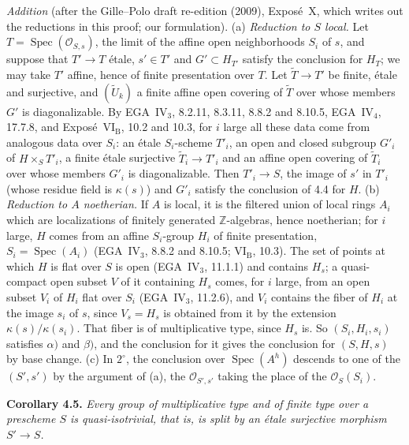 \par\medskip\noindent
\emph{Addition} (after the Gille--Polo draft re-edition (2009), Expos\'e~X,
which writes out the reductions in this proof; our formulation).
(a) \emph{Reduction to \(S\) local.} Let \(T=\operatorname{Spec}(\mathcal
O_{S,s})\), the limit of the affine open neighborhoods \(S_i\) of \(s\), and
suppose that \(T'\to T\) étale, \(s'\in T'\) and \(G'\subset H_{T'}\) satisfy
the conclusion for \(H_T\); we may take \(T'\) affine, hence of finite
presentation over \(T\). Let \(\widetilde T\to T'\) be finite, étale and
surjective, and \((\widetilde U_k)\) a finite affine open covering of
\(\widetilde T\) over whose members \(G'\) is diagonalizable. By
EGA~IV\(_3\), 8.2.11, 8.3.11, 8.8.2 and 8.10.5, EGA~IV\(_4\), 17.7.8, and
Expos\'e~VI\(_{\mathrm B}\), 10.2 and 10.3, for \(i\) large all these data
come from analogous data over \(S_i\): an étale \(S_i\)-scheme \(T'_i\), an
open and closed subgroup \(G'_i\) of \(H\times_ST'_i\), a finite étale
surjective \(\widetilde T_i\to T'_i\) and an affine open covering of
\(\widetilde T_i\) over whose members \(G'_i\) is diagonalizable. Then
\(T'_i\to S\), the image of \(s'\) in \(T'_i\) (whose residue field is
\(\kappa(s)\)) and \(G'_i\) satisfy the conclusion of 4.4 for \(H\).
(b) \emph{Reduction to \(A\) noetherian.} If \(A\) is local, it is the
filtered union of local rings \(A_i\) which are localizations of finitely
generated \(\mathbb Z\)-algebras, hence noetherian; for \(i\) large, \(H\)
comes from an affine \(S_i\)-group \(H_i\) of finite presentation,
\(S_i=\operatorname{Spec}(A_i)\) (EGA~IV\(_3\), 8.8.2 and 8.10.5;
VI\(_{\mathrm B}\), 10.3). The set of points at which \(H\) is flat over
\(S\) is open (EGA~IV\(_3\), 11.1.1) and contains \(H_s\); a quasi-compact
open subset \(V\) of it containing \(H_s\) comes, for \(i\) large, from an
open subset \(V_i\) of \(H_i\) flat over \(S_i\) (EGA~IV\(_3\), 11.2.6), and
\(V_i\) contains the fiber of \(H_i\) at the image \(s_i\) of \(s\), since
\(V_s=H_s\) is obtained from it by the extension \(\kappa(s)/\kappa(s_i)\).
That fiber is of multiplicative type, since \(H_s\) is. So
\((S_i,H_i,s_i)\) satisfies \(\alpha)\) and \(\beta)\), and the conclusion
for it gives the conclusion for \((S,H,s)\) by base change. (c) In
\(2^\circ\), the conclusion over \(\operatorname{Spec}(A^h)\) descends to one
of the \((S',s')\) by the argument of (a), the \(\mathcal O_{S',s'}\) taking
the place of the \(\mathcal O_S(S_i)\).

\par\medskip\noindent
\textbf{Corollary 4.5.}\enspace
\emph{Every group of multiplicative type and of finite type over a prescheme
\(S\) is quasi-isotrivial, that is, is split by an étale surjective morphism
\(S'\to S\).}

